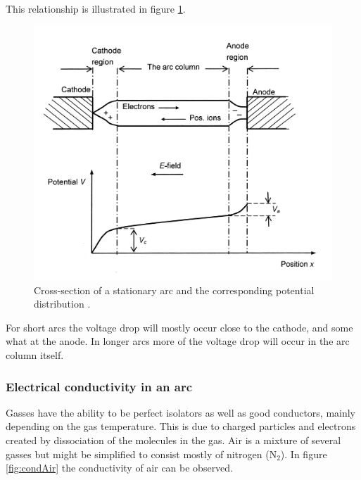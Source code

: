 \documentclass[10pt,a4paper]{article} %
\begin{document}
This relationship is illustrated in figure \ref{fig:potDisArc}.
\begin{figure}[H]
\centering
\includegraphics[scale=0.8]{Bilder/Theory/potentialDistArc.png}
\caption{Cross-section of a stationary arc and the corresponding potential distribution \cite{bib:HVEbreak}.} \label{fig:potDisArc}
\end{figure}

For short arcs the voltage drop will mostly occur close to the cathode, and some what at the anode. In longer arcs more of the voltage drop will occur in the arc column itself.

\subsubsection{Electrical conductivity in an arc} \label{sec:eleCondArc}
Gasses have the ability to be perfect isolators as well as good conductors, mainly depending on the gas temperature. This is due to charged particles and electrons created by dissociation of the molecules in the gas. Air is a mixture of several gasses but might be simplified to consist mostly of nitrogen (N$_2$). In figure \ref{fig:condAir} the conductivity of air can be observed.   
\end{document}
